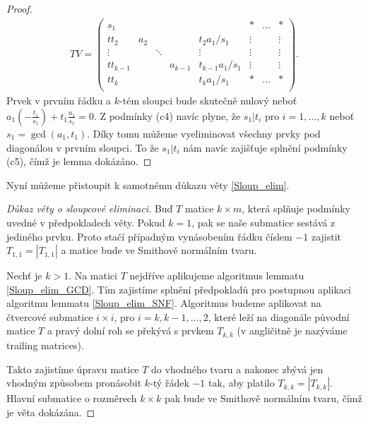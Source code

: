 \begin{proof}
\begin{align*}
TV =
    \left(
    \begin{array}{ccccc|ccc}
        s_1        &     &        &         &                 & \ast   & \hdots & \ast   \\
        tt_2       & a_2 &        &         & t_2 a_1/s_1     & \vdots &        & \vdots \\
        \vdots     &     & \ddots &         & \vdots          & \vdots &        & \vdots \\
        tt_{k - 1} &     &        & a_{k-1} & t_{k-1} a_1/s_1 & \vdots &        & \vdots \\
        tt_k       &     &        &         & t_k a_1/s_1     & \ast   & \hdots & \ast \\
    \end{array}
    \right)
.
\end{align*}
Prvek v prvním řádku a $ k $-tém sloupci bude skutečně nulový neboť
$ a_1(-\frac{t_1}{s_1}) + t_1 \frac{a_1}{s_1} = 0 $. Z podmínky (c4) navíc plyne,
že $ s_1 \vert t_i $ pro $ i = 1,\dots, k $ neboť $ s_1 = \gcd(a_1, t_1) $.
Díky tomu můžeme vyeliminovat všechny prvky pod diagonálou v prvním sloupci.
To že $ s_1 \vert t_i $ nám navíc zajišťuje splnění podmínky (c5), čímž je lemma
dokázáno.
\end{proof}

Nyní můžeme přistoupit k samotnému důkazu věty \ref{Sloup_elim}.
\begin{proof}[Důkaz věty o sloupcové eliminaci]
Buď $ T $ matice $ k \times m $, která splňuje podmínky uvedné v předpokladech
věty. Pokud $ k = 1 $, pak se naše submatice sestává z jediného prvku. Proto
stačí případným vynásobením řádku číslem $ -1 $ zajistit $ T_{1,1} = |T_{1,1}| $
a matice bude ve Smithově normálním tvaru.

Nechť je $ k > 1 $. Na matici $ T $ nejdříve aplikujeme algoritmus lemmatu
\ref{Sloup_elim_GCD}. Tím zajistíme splnění předpokladů pro postupnou aplikaci
algoritmu lemmatu \ref{Sloup_elim_SNF}. Algoritmus budeme aplikovat na čtvercové
submatice $ i \times i $, pro $ i = k,k-1,\dots, 2 $, které leží na diagonále
původní matice $ T $ a pravý dolní roh se překývá s prvkem $ T_{k,k} $
(v angličitně je nazýváme trailing matrices).

Takto zajistíme úpravu matice $ T $ do vhodného tvaru a nakonec zbývá jen
vhodným způsobem pronásobit $ k $-tý řádek $ -1 $ tak, aby platilo
$ T_{k,k} = |T_{k,k}| $. Hlavní submatice o rozměrech $ k \times k $ pak bude
ve Smithově normálním tvaru, čímž je věta dokázána.
\end{proof}



